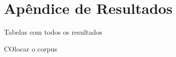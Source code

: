 \chapter{Apêndice de Resultados}
\label{ch09-appendice}

Tabelas com todos os resultados


COlocar o corpus
